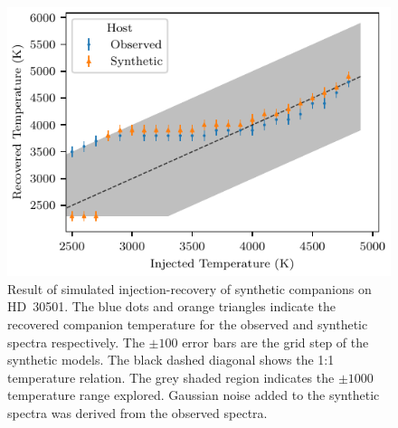 \begin{figure}
    \centering
    \includegraphics[width=0.6\linewidth]{figures/companion_recovery/inject_recovery_hd30501.pdf}
    \caption[Result of simulated injection-recovery of synthetic companions on {HD~30501}.]{Result of simulated injection-recovery of synthetic companions on {HD~30501}.
        The blue dots and orange triangles indicate the recovered companion temperature for the observed and synthetic spectra respectively.
        The \(\pm100\)\K{} error bars are the grid step of the synthetic models.
        The black dashed diagonal shows the 1:1 temperature relation.
        The grey shaded region indicates the \(\pm1000\)\K{} temperature range explored.
        Gaussian noise added to the synthetic spectra was derived from the observed spectra.}
    \label{fig:injectrecoveryhd30501}
\end{figure}


